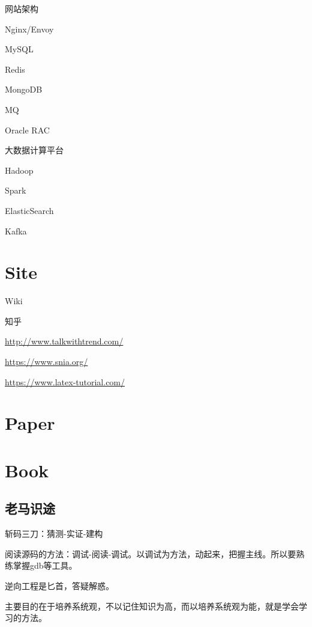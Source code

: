 网站架构
\begin{enumbox}
\item Nginx/Envoy
\item MySQL
\item Redis
\item MongoDB
\item MQ
\item Oracle RAC
\end{enumbox}

大数据计算平台
\begin{enumbox}
\item Hadoop
\item Spark
\item ElasticSearch
\item Kafka
\end{enumbox}

\section{Site}

\begin{enumbox}
\item Wiki
\item 知乎
\item \url{http://www.talkwithtrend.com/}
\item \url{https://www.snia.org/}
\item \url{https://www.latex-tutorial.com/}
\end{enumbox}

\section{Paper}

\section{Book}

\subsection{老马识途}

斩码三刀：猜测-实证-建构

阅读源码的方法：调试-阅读-调试。以调试为方法，动起来，把握主线。所以要熟练掌握gdb等工具。

逆向工程是匕首，答疑解惑。

主要目的在于培养系统观，不以记住知识为高，而以培养系统观为能，就是学会学习的方法。

